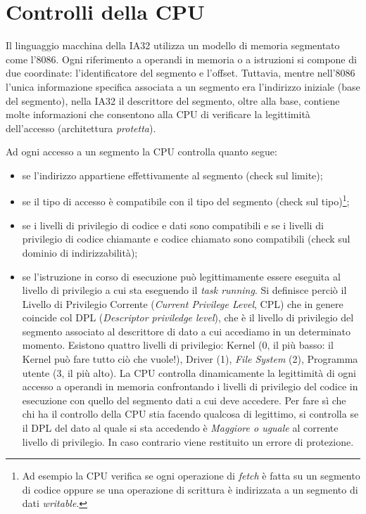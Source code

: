 \section{Controlli della CPU}
\label{sec:controlliCPU}

Il linguaggio macchina della IA32 utilizza un modello di memoria segmentato come l'8086. Ogni riferimento a operandi in memoria o a istruzioni si compone di due coordinate: l'identificatore del segmento e l'offset. Tuttavia, mentre nell'8086 l'unica informazione specifica associata a un segmento era l'indirizzo iniziale (base del segmento), nella IA32 il descrittore del segmento, oltre alla base, contiene molte informazioni che consentono alla CPU di verificare la legittimità dell'accesso (architettura \emph{protetta}).

Ad ogni accesso a un segmento la CPU controlla quanto segue:
\begin{itemize}
\item se l'indirizzo appartiene effettivamente al segmento (check sul limite);
\item se il tipo di accesso è compatibile con il tipo del segmento (check sul tipo)\footnote{Ad esempio la CPU verifica se ogni operazione di \textit{fetch} è fatta su un segmento di codice oppure se una operazione di scrittura è indirizzata a un segmento di dati \textit{writable}.};
\item se i livelli di privilegio di codice e dati sono compatibili e se i livelli di privilegio di codice chiamante e codice chiamato sono compatibili (check sul dominio di indirizzabilità);
\item se l'istruzione in corso di esecuzione può legittimamente essere eseguita al livello di privilegio a cui sta eseguendo il \textit{task running}. Si definisce perciò il Livello di Privilegio Corrente (\textit{Current Privilege Level}, CPL) che in genere coincide col DPL (\textit{Descriptor priviledge level}), che è il livello di privilegio del segmento associato al descrittore di dato a cui accediamo in un determinato momento. Esistono quattro livelli di privilegio: Kernel (0, il più basso: il Kernel può fare tutto ciò che vuole!), Driver (1), \textit{File System} (2), Programma utente (3, il più alto). La CPU controlla dinamicamente la legittimità di ogni accesso a operandi in memoria confrontando i livelli di privilegio del codice in esecuzione con quello del segmento dati a cui deve accedere. Per fare sì che chi ha il controllo della CPU stia facendo qualcosa di legittimo, si controlla se il DPL del dato al quale si sta accedendo è \emph{Maggiore o uguale} al corrente livello di privilegio. In caso contrario viene restituito un errore di protezione.
\end{itemize}

